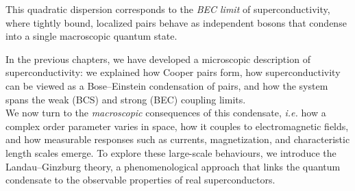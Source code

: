 This quadratic dispersion corresponds to the \textit{BEC limit} of superconductivity, where tightly bound, localized pairs behave as independent bosons that condense into a single macroscopic quantum state.  



\bigskip
\bigskip
\noindent
In the previous chapters, we have developed a microscopic description of superconductivity: we explained how Cooper pairs form, how superconductivity can be viewed as a Bose--Einstein condensation of pairs, and how the system spans the weak (BCS) and strong (BEC) coupling limits.  \\
We now turn to the \emph{macroscopic} consequences of this condensate, \textit{i.e.} how a complex order parameter varies in space, how it couples to electromagnetic fields, and how measurable responses such as currents, magnetization, and characteristic length scales emerge.  
To explore these large-scale behaviours, we introduce the Landau--Ginzburg theory, a phenomenological approach that links the quantum condensate to the observable properties of real superconductors.








